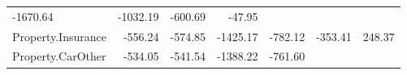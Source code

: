 \documentclass[]{article}
\begin{document}
\begin{longtable}[]{@{}lrrrrrr@{}}
\begin{minipage}[t]{0.08\columnwidth}
-1670.64\strut
\end{minipage} & \begin{minipage}[t]{0.08\columnwidth}\raggedleft\strut
-1032.19\strut
\end{minipage} & \begin{minipage}[t]{0.08\columnwidth}\raggedleft\strut
-600.69\strut
\end{minipage} & \begin{minipage}[t]{0.08\columnwidth}\raggedleft\strut
-47.95\strut
\end{minipage}\tabularnewline
\begin{minipage}[t]{0.31\columnwidth}\raggedright\strut
Property.Insurance\strut
\end{minipage} & \begin{minipage}[t]{0.10\columnwidth}\raggedleft\strut
-556.24\strut
\end{minipage} & \begin{minipage}[t]{0.08\columnwidth}\raggedleft\strut
-574.85\strut
\end{minipage} & \begin{minipage}[t]{0.08\columnwidth}\raggedleft\strut
-1425.17\strut
\end{minipage} & \begin{minipage}[t]{0.08\columnwidth}\raggedleft\strut
-782.12\strut
\end{minipage} & \begin{minipage}[t]{0.08\columnwidth}\raggedleft\strut
-353.41\strut
\end{minipage} & \begin{minipage}[t]{0.08\columnwidth}\raggedleft\strut
248.37\strut
\end{minipage}\tabularnewline
\begin{minipage}[t]{0.31\columnwidth}\raggedright\strut
Property.CarOther\strut
\end{minipage} & \begin{minipage}[t]{0.10\columnwidth}\raggedleft\strut
-534.05\strut
\end{minipage} & \begin{minipage}[t]{0.08\columnwidth}\raggedleft\strut
-541.54\strut
\end{minipage} & \begin{minipage}[t]{0.08\columnwidth}\raggedleft\strut
-1388.22\strut
\end{minipage} & \begin{minipage}[t]{0.08\columnwidth}\raggedleft\strut
-761.60\strut
\end{minipage} & \begin{minipage}[t]{0.08\columnwidth}\raggedleft\strut

\end{minipage}
\end{longtable}
\end{document}
